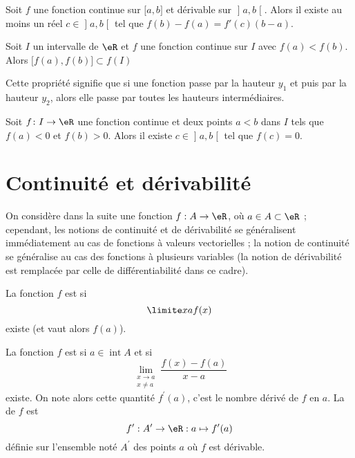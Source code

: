 \begin{theorem}		\label{ThoAccFinisUneVariable}
	Soit $f$ une fonction continue sur $\mathopen[ a , b \mathclose]$ et dérivable sur $\mathopen] a , b \mathclose[$. Alors il existe au moins un réel $c\in\mathopen] a , b \mathclose[$ tel que $f(b)-f(a)=f'(c)(b-a)$.
\end{theorem}

\begin{theorem}		\label{ThoValsIntern}
	Soit $I$ un intervalle de $\eR$ et $f$ une fonction continue sur $I$ avec $f(a)<f(b)$. Alors $\mathopen[ f(a) , f(b) \mathclose]\subset f(I)$
\end{theorem}

Cette propriété signifie que si une fonction passe par la hauteur $y_1$ et puis par la hauteur $y_2$, alors elle passe par toutes les hauteurs intermédiaires.

\begin{corollary}
	Soit $f\colon I\to \eR$ une fonction continue et deux points $a<b$ dans $I$ tels que $f(a)<0$ et $f(b)>0$. Alors il existe $c\in\mathopen] a , b \mathclose[$ tel que $f(c)=0$.
\end{corollary}

\section{Continuité et dérivabilité}
\label{seccontetderiv}

On considère dans la suite une fonction $f : A \to \eR$, où $a \in A \subset \eR$ ; cependant, les notions de continuité et de dérivabilité se généralisent immédiatement au cas de fonctions à valeurs vectorielles ; la notion de continuité se généralise au cas des fonctions à plusieurs variables (la notion de dérivabilité est remplacée par celle de différentiabilité dans ce cadre).

\begin{definition}
    La fonction $f$ est  si
  \begin{equation*}
    \limite x a f(x)
  \end{equation*}
  existe (et vaut alors $f(a)$).
\end{definition}

\begin{definition}
    La fonction $f$ est  si $a \in
  \operatorname{int} A$ et si
  \begin{equation*}
    \lim_{\substack{x\rightarrow a\\x\neq a}} \frac{f(x)-f(a)}{x-a}
  \end{equation*}
  existe. On note alors cette quantité $f^\prime(a)$, c'est le nombre
  dérivé de $f$ en $a$. La  de $f$ est
  \begin{equation*}
    f^\prime : A^\prime \to \eR : a \mapsto f^\prime(a)
  \end{equation*}
  définie sur l'ensemble noté $A^\prime$ des points $a$ où $f$ est
  dérivable.
\end{definition}

